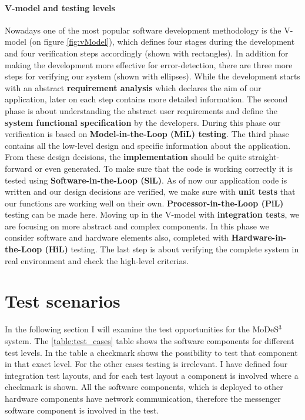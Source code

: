 \paragraph{V-model and testing levels}
Nowadays one of the most popular software development methodology is the V-model \cite{Vmodel} (on figure \ref{fig:vModel}), which defines four stages during the development and four verification steps accordingly (shown with rectangles). In addition for making the development more effective for error-detection, there are three more steps for verifying our system \cite{TestLevels} (shown with ellipses). While the development starts with an abstract \textbf{requirement analysis} which declares the aim of our application, later on each step contains more detailed information. The second phase is about understanding the abstract user requirements and define the \textbf{system functional specification} by the developers. During this phase our verification is based on \textbf{Model-in-the-Loop (MiL) testing}. The third phase contains all the low-level design and specific information about the application. From these design decisions, the \textbf{implementation} should be quite straight-forward or even generated. To make sure that the code is working correctly it is tested using \textbf{Software-in-the-Loop (SiL)}. 
As of now our application code is written and our design decisions are verified, we make sure with \textbf{unit tests} that our functions are working well on their own. \textbf{Processor-in-the-Loop (PiL)} testing can be made here. Moving up in the V-model with \textbf{integration tests}, we are focusing on more abstract and complex components. In this phase we consider software and hardware elements also, completed with \textbf{Hardware-in-the-Loop (HiL)} testing. The last step is about verifying the complete system in real environment and check the high-level criterias.

\section{Test scenarios}
In the following section I will examine the test opportunities for the MoDeS$^3$ system.  The \ref{table:test_cases} table shows the software components for different test levels. In the table a checkmark shows the possibility to test that component in that exact level. For the other cases testing is irrelevant. I have defined four integration test layouts, and for each test layout a component is involved where a checkmark is shown. All the software components, which is deployed to other hardware components have network communication, therefore the messenger software component is involved in the test.

